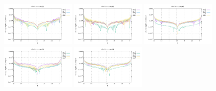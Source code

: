 \noindent
\includegraphics[width=3.5cm]{python_codes/fieldstone_152/RESULTS/exp1/vel_32_m2}
\includegraphics[width=3.5cm]{python_codes/fieldstone_152/RESULTS/exp1/vel_32_m3}
\includegraphics[width=3.5cm]{python_codes/fieldstone_152/RESULTS/exp1/vel_32_m4}
\includegraphics[width=3.5cm]{python_codes/fieldstone_152/RESULTS/exp1/vel_32_m5}
\includegraphics[width=3.5cm]{python_codes/fieldstone_152/RESULTS/exp1/vel_32_m6}

